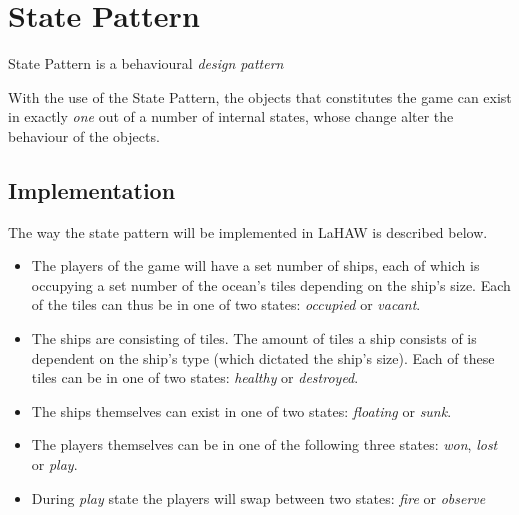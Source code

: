     \section{State Pattern}
    State Pattern is a behavioural \emph{design pattern}
    
    With the use of the State Pattern, the objects that constitutes the game can exist in exactly \emph{one} out of a number of internal states, whose change alter the behaviour of the objects.\cite{online:statepattern}
    
    
    \subsection{Implementation}
    The way the state pattern will be implemented in LaHAW is described below.
    
    \begin{itemize}
    
        \item The players of the game will have a set number of ships, each of which is occupying a set number of the ocean's tiles depending on the ship's size. Each of the tiles can thus be in one of two states: \emph{occupied} or \emph{vacant}.
    
        \item The ships are consisting of tiles. The amount of tiles a ship consists of is dependent on the ship's type (which dictated the ship's size). Each of these tiles can be in one of two states: \emph{healthy} or \emph{destroyed}.
    
        \item The ships themselves can exist in one of two states: \emph{floating} or \emph{sunk}.
    
        \item The players themselves can be in one of the following three states: \emph{won}, \emph{lost} or \emph{play}.
    
        \item During \emph{play} state the players will swap between two states: \emph{fire} or \emph{observe}
    
    \end{itemize}
    
